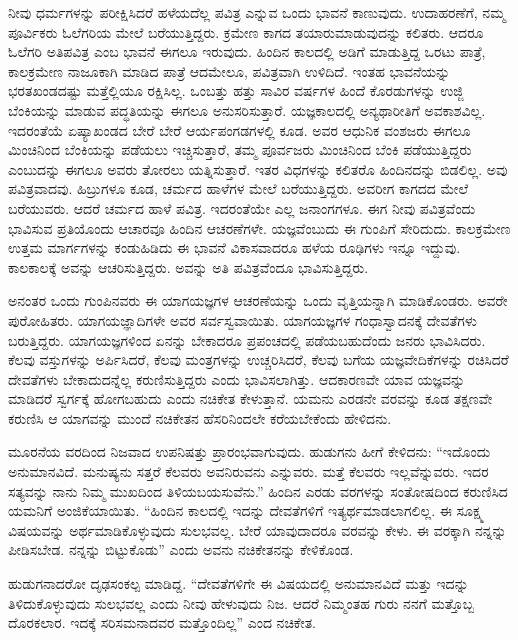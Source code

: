 \vskip 0.2cm 

ನೀವು ಧರ್ಮಗಳನ್ನು ಪರೀಕ್ಷಿಸಿದರೆ ಹಳೆಯದೆಲ್ಲ ಪವಿತ್ರ ಎನ್ನುವ ಒಂದು ಭಾವನೆ ಕಾಣುವುದು. ಉದಾಹರಣೆಗೆ, ನಮ್ಮ ಪೂರ್ವಿಕರು ಓಲೆಗರಿಯ ಮೇಲೆ ಬರೆಯುತ್ತಿದ್ದರು. ಕ್ರಮೇಣ ಕಾಗದ ತಯಾರುಮಾಡುವುದನ್ನು ಕಲಿತರು. ಆದರೂ ಓಲೆಗರಿ ಅತಿಪವಿತ್ರ ಎಂಬ ಭಾವನೆ ಈಗಲೂ ಇರುವುದು. ಹಿಂದಿನ ಕಾಲದಲ್ಲಿ ಅಡಿಗೆ ಮಾಡುತ್ತಿದ್ದ ಒರಟು ಪಾತ್ರೆ, ಕಾಲಕ್ರಮೇಣ ನಾಜೂಕಾಗಿ ಮಾಡಿದ ಪಾತ್ರೆ ಆದಮೇಲೂ, ಪವಿತ್ರವಾಗಿ ಉಳಿದಿದೆ. ಇಂತಹ ಭಾವನೆಯನ್ನು ಭರತಖಂಡದಷ್ಟು ಮತ್ತೆಲ್ಲಿಯೂ ರಕ್ಷಿಸಿಲ್ಲ. ಒಂಬತ್ತು ಹತ್ತು ಸಾವಿರ ವರ್ಷಗಳ ಹಿಂದೆ ಕೊರಡುಗಳನ್ನು ಉಜ್ಜಿ ಬೆಂಕಿಯನ್ನು ಮಾಡುವ ಪದ್ಧತಿಯನ್ನು ಈಗಲೂ ಅನುಸರಿಸುತ್ತಾರೆ. ಯಜ್ಞಕಾಲದಲ್ಲಿ ಅನ್ಯಥಾರೀತಿಗೆ ಅವಕಾಶವಿಲ್ಲ. ಇದರಂತೆಯೆ ಏಷ್ಯಾಖಂಡದ ಬೇರೆ ಬೇರೆ ಆರ್ಯಪಂಗಡಗಳಲ್ಲಿ ಕೂಡ. ಅವರ ಆಧುನಿಕ ವಂಶಜರು ಈಗಲೂ ಮಿಂಚಿನಿಂದ ಬೆಂಕಿಯನ್ನು ಪಡೆಯಲು ಇಚ್ಚಿಸುತ್ತಾರೆ, ತಮ್ಮ ಪೂರ್ವಜರು ಮಿಂಚಿನಿಂದ ಬೆಂಕಿ ಪಡೆಯುತ್ತಿದ್ದರು ಎಂಬುದನ್ನು ಈಗಲೂ ಅವರು ತೋರಲು ಯತ್ನಿಸುತ್ತಾರೆ. ಇತರ ವಿಧಗಳನ್ನು ಕಲಿತರೊ ಹಿಂದಿನದನ್ನು ಬಿಡಲಿಲ್ಲ. ಅವು ಪವಿತ್ರವಾದವು. ಹಿಬ್ರುಗಳೂ ಕೂಡ, ಚರ್ಮದ ಹಾಳೆಗಳ ಮೇಲೆ ಬರೆಯುತ್ತಿದ್ದರು. ಅವರೀಗ ಕಾಗದದ ಮೇಲೆ ಬರೆಯುವರು. ಆದರೆ ಚರ್ಮದ ಹಾಳೆ ಪವಿತ್ರ. ಇದರಂತೆಯೇ ಎಲ್ಲ ಜನಾಂಗಗಳೂ. ಈಗ ನೀವು ಪವಿತ್ರವೆಂದು ಭಾವಿಸುವ ಪ್ರತಿಯೊಂದು ಆಚಾರವೂ ಹಿಂದಿನ ಆಚರಣೆಗಳೇ. ಯಜ್ಞವೆಂಬುದು ಈ ಗುಂಪಿಗೆ ಸೇರಿದುದು. ಕಾಲಕ್ರಮೇಣ ಉತ್ತಮ ಮಾರ್ಗಗಳನ್ನು ಕಂಡುಹಿಡಿದು ಈ ಭಾವನೆ ವಿಕಾಸವಾದರೂ ಹಳೆಯ ರೂಢಿಗಳು ಇನ್ನೂ ಇದ್ದುವು. ಕಾಲಕಾಲಕ್ಕೆ ಅವನ್ನು ಆಚರಿಸುತ್ತಿದ್ದರು. ಅವನ್ನು ಅತಿ ಪವಿತ್ರವೆಂದೂ ಭಾವಿಸುತ್ತಿದ್ದರು.

\vskip 0.2cm 

ಅನಂತರ ಒಂದು ಗುಂಪಿನವರು ಈ ಯಾಗಯಜ್ಞಗಳ ಆಚರಣೆಯನ್ನು ಒಂದು ವೃತ್ತಿಯನ್ನಾಗಿ ಮಾಡಿಕೊಂಡರು. ಅವರೇ ಪುರೋಹಿತರು. ಯಾಗಯಜ್ಞಾದಿಗಳೇ ಅವರ ಸರ್ವಸ್ವವಾಯಿತು. ಯಾಗಯಜ್ಞಗಳ ಗಂಧಾಸ್ವಾದನಕ್ಕೆ ದೇವತೆಗಳು ಬರುತ್ತಿದ್ದರು. ಯಾಗಯಜ್ಞಗಳಿಂದ ಏನನ್ನು ಬೇಕಾದರೂ ಪ್ರಪಂಚದಲ್ಲಿ ಪಡೆಯಬಹುದೆಂದು ಜನರು ಭಾವಿಸಿದರು. ಕೆಲವು ವಸ್ತುಗಳನ್ನು ಅರ್ಪಿಸಿದರೆ, ಕೆಲವು ಮಂತ್ರಗಳನ್ನು ಉಚ್ಚರಿಸಿದರೆ, ಕೆಲವು ಬಗೆಯ ಯಜ್ಞವೇದಿಕೆಗಳನ್ನು ರಚಿಸಿದರೆ ದೇವತೆಗಳು ಬೇಕಾದುದನ್ನೆಲ್ಲ ಕರುಣಿಸುತ್ತಿದ್ದರು ಎಂದು ಭಾವಿಸಲಾಗಿತ್ತು. ಆದಕಾರಣವೇ ಯಾವ ಯಜ್ಞವನ್ನು ಮಾಡಿದರೆ ಸ್ವರ್ಗಕ್ಕೆ ಹೋಗಬಹುದು ಎಂದು ನಚಿಕೇತ ಕೇಳುತ್ತಾನೆ. ಯಮನು ಎರಡನೇ ವರವನ್ನು ಕೂಡ ತಕ್ಷಣವೇ ಕರುಣಿಸಿ ಆ ಯಾಗವನ್ನು ಮುಂದೆ ನಚಿಕೇತನ ಹೆಸರಿನಿಂದಲೇ ಕರೆಯಬೇಕೆಂದು ಹೇಳಿದನು.

ಮೂರನೆಯ ವರದಿಂದ ನಿಜವಾದ ಉಪನಿಷತ್ತು ಪ್ರಾರಂಭವಾಗುವುದು. ಹುಡುಗನು ಹೀಗೆ ಕೇಳಿದನು: “ಇದೊಂದು ಅನುಮಾನವಿದೆ. ಮನುಷ್ಯನು ಸತ್ತರೆ ಕೆಲವರು ಅವನಿರುವನು ಎನ್ನುವರು. ಮತ್ತೆ ಕೆಲವರು ಇಲ್ಲವೆನ್ನುವರು. ಇದರ ಸತ್ಯವನ್ನು ನಾನು ನಿಮ್ಮ ಮುಖದಿಂದ ತಿಳಿಯಬಯಸುವೆನು.” ಹಿಂದಿನ ಎರಡು ವರಗಳನ್ನು ಸಂತೋಷದಿಂದ ಕರುಣಿಸಿದ ಯಮನಿಗೆ ಅಂಜಿಕೆಯಾಯಿತು. “ಹಿಂದಿನ ಕಾಲದಲ್ಲಿ ಇದನ್ನು ದೇವತೆಗಳಿಗೆ ಇತ್ಯರ್ಥಮಾಡಲಾಗಲಿಲ್ಲ. ಈ ಸೂಕ್ಷ್ಮ ವಿಷಯವನ್ನು ಅರ್ಥಮಾಡಿಕೊಳ್ಳುವುದು ಸುಲಭವಲ್ಲ. ಬೇರೆ ಯಾವುದಾದರೂ ವರವನ್ನು ಕೇಳು. ಈ ವರಕ್ಕಾಗಿ ನನ್ನನ್ನು ಪೀಡಿಸಬೇಡ. ನನ್ನನ್ನು ಬಿಟ್ಟುಕೊಡು” ಎಂದು ಅವನು ನಚಿಕೇತನನ್ನು ಕೇಳಿಕೊಂಡ.

ಹುಡುಗನಾದರೋ ದೃಢಸಂಕಲ್ಪ ಮಾಡಿದ್ದ. “ದೇವತೆಗಳಿಗೇ ಈ ವಿಷಯದಲ್ಲಿ ಅನುಮಾನವಿದೆ ಮತ್ತು ಇದನ್ನು ತಿಳಿದುಕೊಳ್ಳುವುದು ಸುಲಭವಲ್ಲ ಎಂದು ನೀವು ಹೇಳುವುದು ನಿಜ. ಆದರೆ ನಿಮ್ಮಂತಹ ಗುರು ನನಗೆ ಮತ್ತೊಬ್ಬ ದೊರಕಲಾರ. ಇದಕ್ಕೆ ಸರಿಸಮನಾದವರ ಮತ್ತೊಂದಿಲ್ಲ” ಎಂದ ನಚಿಕೇತ.

